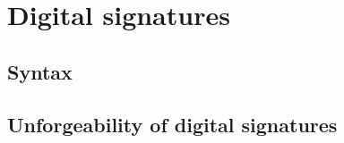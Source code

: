 \documentclass[../../main.tex]{subfiles}
\begin{document}
\onlyinsubfile
{
    
}

\section{Digital signatures}\label{sec-ds}
    \subsection{Syntax}
        
    \subsection{Unforgeability of digital signatures}
        

\onlyinsubfile
{
    \begin{small}
        
        
    \end{small}
}
\end{document}
